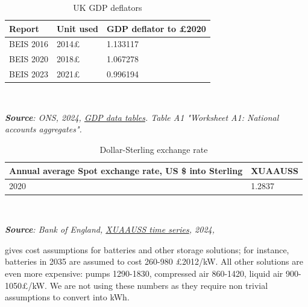 \begin{table}[H]
\caption{UK GDP deflators}
\label{tab_inflation}
\begin{tabular}{@{}lll@{}}
\toprule
Report    & Unit used & GDP deflator to £2020\\ \midrule
BEIS 2016 & 2014£     & 1.133117                                             \\
BEIS 2020 & 2018£     & 1.067278                                             \\
BEIS 2023 & 2021£     & 0.996194                                             \\ \bottomrule
\end{tabular}
  {\\\raggedright \textit{\textbf{Source}: ONS, 2024, \href{https://www.ons.gov.uk/economy/grossdomesticproductgdp/datasets/uksecondestimateofgdpdatatables}{ GDP data tables}. Table A1 "Worksheet A1: National accounts aggregates". \\}}
\end{table}

\begin{table}[H]
\caption{Dollar-Sterling exchange rate}
\label{tab_echange_rate}
\begin{tabular}{@{}ll@{}}
\toprule
Annual average   Spot exchange rate, US \$ into Sterling & XUAAUSS \\ \midrule
2020                                                     & 1.2837  \\ \bottomrule
\end{tabular}
 {\\\centering\raggedright \textit{\textbf{Source}: Bank of England, \href{https://www.bankofengland.co.uk/boeapps/database/fromshowcolumns.asp?Travel=NIxAZxSUx&FromSeries=1&ToSeries=50&DAT=RNG&FD=1&FM=Jan&FY=2019&TD=28&TM=Feb&TY=2024&FNY=Y&CSVF=TT&html.x=66&html.y=26&SeriesCodes=XUAAUSS&UsingCodes=Y&Filter=N&title=XUAAUSS&VPD=Y}{XUAAUSS time series}, 2024, \\}}
\end{table}


\citet[table 2.1, p.51]{cccDeliveringReliableDecarbonised2023} gives cost assumptions for batteries and other storage solutions; for instance, batteries in 2035 are assumed to cost 260-980 £2012/kW. All other solutions are even more expensive: pumps 1290-1830, compressed air 860-1420, liquid air 900-1050£/kW. We are not using these numbers as they require non trivial assumptions to convert into kWh.

